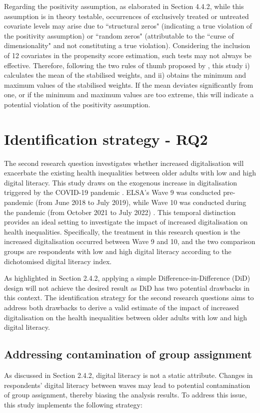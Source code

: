Regarding the positivity assumption, as elaborated in Section 4.4.2, while this assumption is in theory testable, occurrences of exclusively treated or untreated covariate levels may arise due to ``structural zeros" (indicating a true violation of the positivity assumption) or ``random zeros" (attributable to the ``curse of dimensionality" and not constituting a true violation). Considering the inclusion of 12 covariates in the propensity score estimation, such tests may not always be effective. Therefore, following the two rules of thumb proposed by \textcite{cole_constructing_2008}, this study i) calculates the mean of the stabilised weights, and ii) obtains the minimum and maximum values of the stabilised weights. If the mean deviates significantly from one, or if the minimum and maximum values are too extreme, this will indicate a potential violation of the positivity assumption. 

\section{Identification strategy - RQ2}
The second research question investigates whether increased digitalisation will exacerbate the existing health inequalities between older adults with low and high  digital literacy. This study draws on the exogenous increase in digitalisation triggered by the COVID-19 pandemic \parencite{pandit_smartphone_2022,spanakis_digital_2021}. ELSA's Wave 9 was conducted pre-pandemic (from June 2018 to July 2019), while Wave 10 was conducted during the pandemic (from October 2021 to July 2022) \parencite{natcensocialresearch_user_2020,natcensocialresearch_interviewer_2022}. This temporal distinction provides an ideal setting to investigate the impact of increased digitalisation on health inequalities. Specifically, the treatment in this research question is the increased digitalisation occurred between Wave 9 and 10, and the two comparison groups are respondents with low and high digital literacy according to the dichotomised digital literacy index.

As highlighted in Section 2.4.2, applying a simple Difference-in-Difference (DiD) design will not achieve the desired result as DiD has two potential drawbacks in this context. The identification strategy for the second research questions aims to address both drawbacks to derive a valid estimate of the impact of increased digitalisation on the health inequalities between older adults with low and high digital literacy.

\subsection{Addressing contamination of group assignment}
As discussed in Section 2.4.2, digital literacy is not a static attribute. Changes in respondents' digital literacy between waves may lead to potential contamination of group assignment, thereby biasing the analysis results. To address this issue, this study implements the following strategy:

